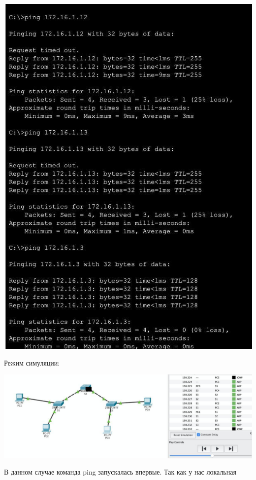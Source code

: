 \documentclass[a4paper,14pt]{extarticle}
\begin{document}
    \begin{center}
        \includegraphics[scale=0.5]{3}
    \end{center}
    \par Режим симуляции:
    \begin{center}
        \includegraphics[scale=0.5]{2.jpg}
    \end{center}
    \par В данном случае команда ping запускалась впервые. Так как у нас локальная 
\end{document}

